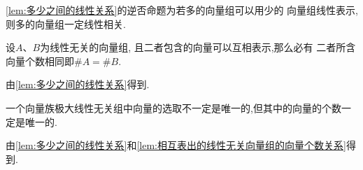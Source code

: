 \begin{green}
\begin{corollary}[逆否命题]\label{cor:逆否命题}
\cref{lem:多少之间的线性关系}的逆否命题为若多的向量组可以用少的
向量组线性表示,则多的向量组一定线性相关.
\end{corollary}
\end{green}
\begin{green}
\begin{lemma}[相互表出的线性无关向量组的向量个数关系]\label{lem:相互表出的线性无关向量组的向量个数关系}
    设$A$、$B$为线性无关的向量组,
    且二者包含的向量可以互相表示,那么必有
    二者所含向量个数相同即$\#A=\#B$.
\end{lemma}
\begin{Proof}
由\cref{lem:多少之间的线性关系}得到.
\end{Proof}
\end{green}
\begin{green}
\begin{corollary}[极大无关组向量个数唯一]\label{cor:极大无关组向量个数唯一}
    一个向量族极大线性无关组中向量的选取不一定是唯一的,但其中的向量的个数一定是唯一的.
\end{corollary}
\begin{Proof}
由\cref{lem:多少之间的线性关系}和\cref{lem:相互表出的线性无关向量组的向量个数关系}得到.
\end{Proof}
\end{green}
